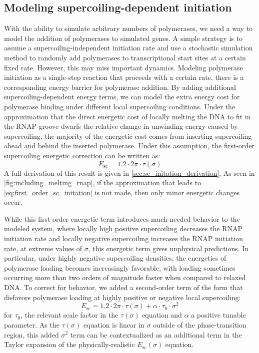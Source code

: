 \documentclass[11pt]{article}
\begin{document}
\subsection{Modeling supercoiling-dependent initiation}
With the ability to simulate arbitrary numbers of polymerases, we need a way to model the addition of polymerases to simulated genes. A simple strategy is to assume a supercoiling-independent initiation rate and use a stochastic simulation method to randomly add polymerases to transcriptional start sites at a certain fixed rate. However, this may miss important dynamics. Modeling polymerase initiation as a single-step reaction that proceeds with a certain rate, there is a corresponding energy barrier for polymerase addition. By adding additional supercoiling-dependent energy terms, we can model the extra energy cost for polymerase binding under different local supercoiling conditions. Under the approximation that the direct energetic cost of locally melting the DNA to fit in the RNAP groove dwarfs the relative change in unwinding energy caused by supercoiling, the majority of the energetic cost comes from inserting supercoiling ahead and behind the inserted polymerase. Under this assumption, the first-order supercoiling energetic correction can be written as:
\begin{equation}
    E_\text{sc} = 1.2  \cdot 2\pi \cdot \tau(\sigma)
\label{eq:first_order_sc_initation}
\end{equation}
A full derivation of this result is given in \cref{sec:sc_initation_derivation}. As seen in \cref{fig:including_melting_rnap}, if the approximation that leads to \cref{eq:first_order_sc_initation} is not made, then only minor energetic changes occur.

While this first-order energetic term introduces much-needed behavior to the modeled system, where locally high positive supercoiling decreases the RNAP initiation rate and locally negative supercoiling increases the RNAP initiation rate, at extreme values of \(\sigma\), this energetic term gives unphysical predictions. In particular, under highly negative supercoiling densities, the energetics of polymerase loading becomes increasingly favorable, with loading sometimes occurring more than two orders of magnitude faster when compared to relaxed DNA. To correct for behavior, we added a second-order term of the form that disfavors polymerase loading at highly positive or negative local supercoiling:
\begin{equation}
    E_\text{sc} = 1.2  \cdot 2\pi \cdot \tau(\sigma) + \alpha \cdot \tau_0 \cdot \sigma^2
\label{eq:second_order_sc_initation}
\end{equation}
for \(\tau_0\), the relevant scale factor in the \(\tau(\sigma)\) equation \parencite{markoTorqueDynamicsLinking2007} and \(\alpha\) a positive tunable parameter. As the \(\tau(\sigma)\) equation is linear in \(\sigma\) outside of the phase-transition region, this added \(\sigma^2\) term can be contextualized as an additional term in the Taylor expansion of the physically-realistic \(E_\text{sc}(\sigma)\) equation.
\end{document}
